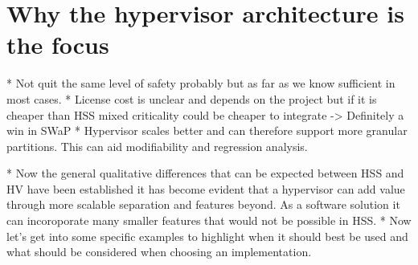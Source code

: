 
\section{Why the hypervisor architecture is the focus}

* Not quit the same level of safety probably but as far as we know sufficient in most cases. 
* License cost is unclear and depends on the project but if it is cheaper than HSS mixed criticality could be cheaper to integrate
-> Definitely a win in SWaP
* Hypervisor scales better and can therefore support more granular partitions. This can aid modifiability and regression analysis.

* Now the general qualitative differences that can be expected between HSS and HV have been established it has become evident that a hypervisor can add value through more scalable separation and features beyond. As a software solution it can incoroporate many smaller features that would not be possible in HSS.
* Now let's get into some specific examples to highlight when it should best be used and what should be considered when choosing an implementation.
